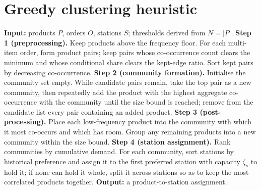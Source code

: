 \documentclass[]{interact}
\begin{document}
\appendix
\section{Greedy clustering heuristic}\label{app:heuristic}
\begin{algorithm}[t]
\caption{Greedy product clustering and station assignment}
\label{alg:heuristic}
\begin{algorithmic}[1]
\State \textbf{Input:} products $P$, orders $O$, stations $S$; thresholds derived from $N=|P|$.
\State \textbf{Step 1 (preprocessing).} Keep products above the frequency floor. For each multi-item order, form product pairs; keep pairs whose co-occurrence count clears the minimum and whose conditional share clears the kept-edge ratio. Sort kept pairs by decreasing co-occurrence.
\State \textbf{Step 2 (community formation).} Initialise the community set empty. While candidate pairs remain, take the top pair as a new community, then repeatedly add the product with the highest aggregate co-occurrence with the community until the size bound is reached; remove from the candidate list every pair containing an added product.
\State \textbf{Step 3 (post-processing).} Place each low-frequency product into the community with which it most co-occurs and which has room. Group any remaining products into a new community within the size bound.
\State \textbf{Step 4 (station assignment).} Rank communities by cumulative demand. For each community, sort stations by historical preference and assign it to the first preferred station with capacity $\zeta_s$ to hold it; if none can hold it whole, split it across stations so as to keep the most correlated products together.
\State \textbf{Output:} a product-to-station assignment.
\end{algorithmic}
\end{algorithm}
\end{document}
